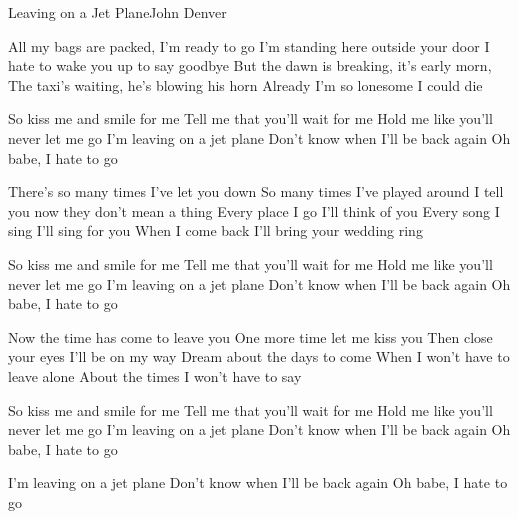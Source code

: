 \begin{song}{Leaving on a Jet Plane}{John Denver}{}


All my bags are packed, I'm ready to go
I'm standing here outside your door
I hate to wake you up to say goodbye
But the dawn is breaking, it's early morn,
The taxi's waiting, he's blowing his horn
Already I'm so lonesome I could die

So kiss me and smile for me
Tell me that you'll wait for me
Hold me like you'll never let me go
I'm leaving on a jet plane
Don't know when I'll be back again
Oh babe, I hate to go

There's so many times I've let you down
So many times I've played around
I tell you now they don't mean a thing
Every place I go I'll think of you
Every song I sing I'll sing for you
When I come back I'll bring your wedding ring

So kiss me and smile for me
Tell me that you'll wait for me
Hold me like you'll never let me go
I'm leaving on a jet plane
Don't know when I'll be back again
Oh babe, I hate to go

Now the time has come to leave you
One more time let me kiss you
Then close your eyes I'll be on my way
Dream about the days to come
When I won't have to leave alone
About the times I won't have to say

So kiss me and smile for me
Tell me that you'll wait for me
Hold me like you'll never let me go
I'm leaving on a jet plane
Don't know when I'll be back again
Oh babe, I hate to go

I'm leaving on a jet plane
Don't know when I'll be back again
Oh babe, I hate to go
\end{song}
